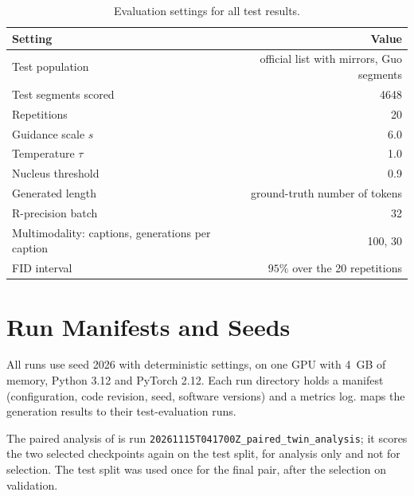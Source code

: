 \begin{table}[H]
\centering
\caption{Evaluation settings for all test results.}
\label{tab:app_eval}
\begin{tabular}{lr}
\toprule
Setting & Value \\
\midrule
Test population & official list with mirrors, Guo segments \\
Test segments scored & 4648 \\
Repetitions & 20 \\
Guidance scale $s$ & 6.0 \\
Temperature $\tau$ & 1.0 \\
Nucleus threshold & 0.9 \\
Generated length & ground-truth number of tokens \\
R-precision batch & 32 \\
Multimodality: captions, generations per caption & 100, 30 \\
FID interval & $95\%$ over the 20 repetitions \\
\bottomrule
\end{tabular}
\end{table}

\section{Run Manifests and Seeds}
\label{sec:app_runs}

All runs use seed 2026 with deterministic settings, on one GPU with 4~GB of memory, Python 3.12 and PyTorch 2.12. Each run directory holds a manifest (configuration, code revision, seed, software versions) and a metrics log.  maps the generation results to their test-evaluation runs.

\begin{table}[H]
\centering
\caption{Test-evaluation runs behind the generation tables. FID is the mean over 20 repetitions with the half-width of its $95\%$ interval.}
\label{tab:app_runs}
\end{table}

The paired analysis of  is run \texttt{20261115T041700Z\_paired\_twin\_analysis}; it scores the two selected checkpoints again on the test split, for analysis only and not for selection. The test split was used once for the final pair, after the selection on validation.
